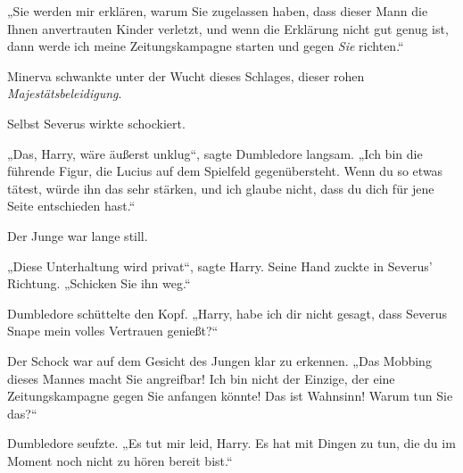 „Sie werden mir erklären, warum Sie zugelassen haben, dass dieser Mann die Ihnen anvertrauten Kinder verletzt, und wenn die Erklärung nicht gut genug ist, dann werde ich meine Zeitungskampagne starten und gegen \emph{Sie} richten.“

Minerva schwankte unter der Wucht dieses Schlages, dieser rohen \emph{Majestätsbeleidigung}.

Selbst Severus wirkte schockiert.

„Das, Harry, wäre äußerst unklug“, sagte Dumbledore langsam.
„Ich bin die führende Figur, die Lucius auf dem Spielfeld gegenübersteht. Wenn du so etwas tätest, würde ihn das sehr stärken, und ich glaube nicht, dass du dich für jene Seite entschieden hast.“

Der Junge war lange still.

„Diese Unterhaltung wird privat“, sagte Harry. Seine Hand zuckte in Severus’ Richtung.
„Schicken Sie ihn weg.“

Dumbledore schüttelte den Kopf.
„Harry, habe ich dir nicht gesagt, dass Severus Snape mein volles Vertrauen genießt?“

Der Schock war auf dem Gesicht des Jungen klar zu erkennen.
„Das Mobbing dieses Mannes macht Sie angreifbar! Ich bin nicht der Einzige, der eine Zeitungskampagne gegen Sie anfangen könnte! Das ist Wahnsinn! Warum tun Sie das?“

Dumbledore seufzte.
„Es tut mir leid, Harry. Es hat mit Dingen zu tun, die du im Moment noch nicht zu hören bereit bist.“

